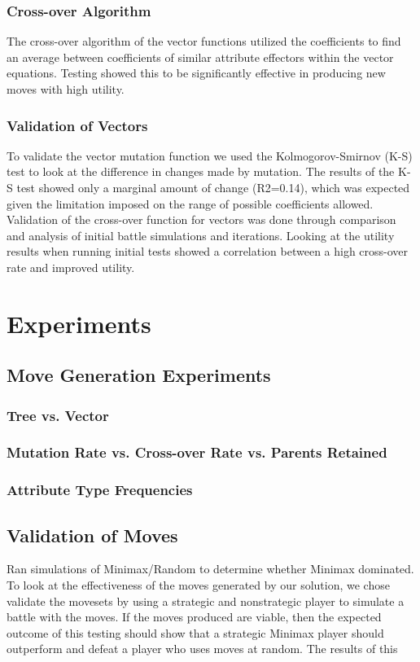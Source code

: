 \documentclass{acm_proc_article-sp}
\begin{document}
    \subsubsection{Cross-over Algorithm}
    The cross-over algorithm of the vector functions utilized the coefficients to find an average between coefficients of similar attribute effectors within the vector equations. Testing showed this to be significantly effective in producing new moves with high utility.
    
    \subsubsection{Validation of Vectors}
    To validate the vector mutation function we used the Kolmogorov-Smirnov (K-S)  test to look at the difference in changes made by mutation. The results of the K-S test showed only a marginal amount of change (R2=0.14), which was expected given the limitation imposed on the range of possible coefficients allowed.
    Validation of the cross-over function for vectors was done through comparison and analysis of initial battle simulations and iterations. Looking at the utility results when running initial tests showed a correlation between a high cross-over rate and improved utility.
    
    
    \section{Experiments}
    
    \subsection{Move Generation Experiments}
    
    \subsubsection{Tree vs. Vector}
    \subsubsection{Mutation Rate vs. Cross-over Rate vs. Parents Retained}
    \subsubsection{Attribute Type Frequencies}
    
    \subsection{Validation of Moves}
    Ran simulations of Minimax/Random to determine whether Minimax dominated.
    To look at the effectiveness of the moves generated by our solution, we chose validate the movesets by using a strategic and nonstrategic player to simulate a battle with the moves. If the moves produced are viable, then the expected outcome of this testing should show that a strategic Minimax player should outperform and defeat a player who uses moves at random.
    The results of this 
    
\end{document}
